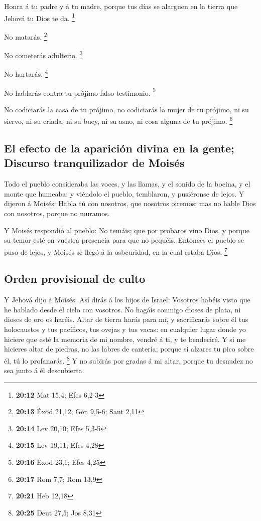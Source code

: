  Honra á tu padre y á tu madre, porque tus días se
alarguen en la tierra que Jehová tu Dios te da. \footnote{\textbf{20:12}
  Mat 15,4; Efes 6,2-3}

 No matarás. \footnote{\textbf{20:13} Éxod 21,12; Gén
  9,5-6; Sant 2,11}

 No cometerás adulterio. \footnote{\textbf{20:14} Lev
  20,10; Efes 5,3-5}

 No hurtarás. \footnote{\textbf{20:15} Lev 19,11; Efes
  4,28}

 No hablarás contra tu prójimo falso testimonio.
\footnote{\textbf{20:16} Éxod 23,1; Efes 4,25}

 No codiciarás la casa de tu prójimo, no codiciarás la
mujer de tu prójimo, ni su siervo, ni su criada, ni su buey, ni su asno,
ni cosa alguna de tu prójimo. \footnote{\textbf{20:17} Rom 7,7; Rom 13,9}

\hypertarget{el-efecto-de-la-apariciuxf3n-divina-en-la-gente-discurso-tranquilizador-de-moisuxe9s}{%
\subsection{El efecto de la aparición divina en la gente; Discurso
tranquilizador de
Moisés}\label{el-efecto-de-la-apariciuxf3n-divina-en-la-gente-discurso-tranquilizador-de-moisuxe9s}}

 Todo el pueblo consideraba las voces, y las llamas, y el
sonido de la bocina, y el monte que humeaba: y viéndolo el pueblo,
temblaron, y pusiéronse de lejos.  Y dijeron á Moisés:
Habla tú con nosotros, que nosotros oiremos; mas no hable Dios con
nosotros, porque no muramos.

 Y Moisés respondió al pueblo: No temáis; que por
probaros vino Dios, y porque su temor esté en vuestra presencia para que
no pequéis.  Entonces el pueblo se puso de lejos, y
Moisés se llegó á la osbcuridad, en la cual estaba Dios. \footnote{\textbf{20:21}
  Heb 12,18}

\hypertarget{orden-provisional-de-culto}{%
\subsection{Orden provisional de
culto}\label{orden-provisional-de-culto}}

 Y Jehová dijo á Moisés: Así dirás á los hijos de Israel:
Vosotros habéis visto que he hablado desde el cielo con vosotros.
 No hagáis conmigo dioses de plata, ni dioses de oro os
haréis.  Altar de tierra harás para mí, y sacrificarás
sobre él tus holocaustos y tus pacíficos, tus ovejas y tus vacas: en
cualquier lugar donde yo hiciere que esté la memoria de mi nombre,
vendré á ti, y te bendeciré.  Y si me hicieres altar de
piedras, no las labres de cantería; porque si alzares tu pico sobre él,
tú lo profanarás. \footnote{\textbf{20:25} Deut 27,5; Jos 8,31}
 Y no subirás por gradas á mi altar, porque tu desnudez
no sea junto á él descubierta.

